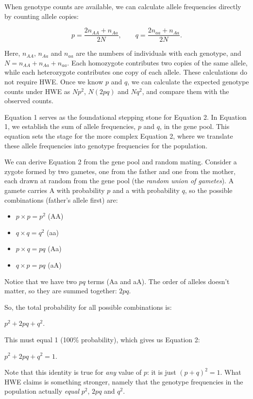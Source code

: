\documentclass[
  a4paper]{book}
\providecommand{\tightlist}{%
  \setlength{\itemsep}{0pt}\setlength{\parskip}{0pt}}
\begin{document}
When genotype counts are available, we can calculate allele frequencies directly by counting allele copies:

\[
p = \frac{2n_{AA} + n_{Aa}}{2N}, \qquad
q = \frac{2n_{aa} + n_{Aa}}{2N}.
\]

Here, \(n_{AA}\), \(n_{Aa}\) and \(n_{aa}\) are the numbers of individuals with each genotype, and \(N = n_{AA} + n_{Aa} + n_{aa}\). Each homozygote contributes two copies of the same allele, while each heterozygote contributes one copy of each allele. These calculations do not require HWE. Once we know \(p\) and \(q\), we can calculate the expected genotype counts under HWE as \(Np^2\), \(N(2pq)\) and \(Nq^2\), and compare them with the observed counts.

Equation 1 serves as the foundational stepping stone for Equation 2. In Equation 1, we establish the sum of allele frequencies, \(p\) and \(q\), in the gene pool. This equation sets the stage for the more complex Equation 2, where we translate these allele frequencies into genotype frequencies for the population.

We can derive Equation 2 from the gene pool and random mating. Consider a zygote formed by two gametes, one from the father and one from the mother, each drawn at random from the gene pool (the \emph{random union of gametes}). A gamete carries A with probability \(p\) and a with probability \(q\), so the possible combinations (father's allele first) are:

\begin{itemize}
\tightlist
\item
  \(p \times p = p^2\) (AA)
\item
  \(q \times q = q^2\) (aa)
\item
  \(p \times q = pq\) (Aa)
\item
  \(q \times p = pq\) (aA)
\end{itemize}

Notice that we have two \(pq\) terms (Aa and aA). The order of alleles doesn't matter, so they are summed together: \(2pq\).

So, the total probability for all possible combinations is:

\(p^2 + 2pq + q^2\).

This must equal 1 (100\% probability), which gives us Equation 2:

\(p^2 + 2pq + q^2 = 1\).

Note that this identity is true for \emph{any} value of \(p\): it is just \((p + q)^2 = 1\). What HWE claims is something stronger, namely that the genotype frequencies in the population actually \emph{equal} \(p^2\), \(2pq\) and \(q^2\).
\end{document}
